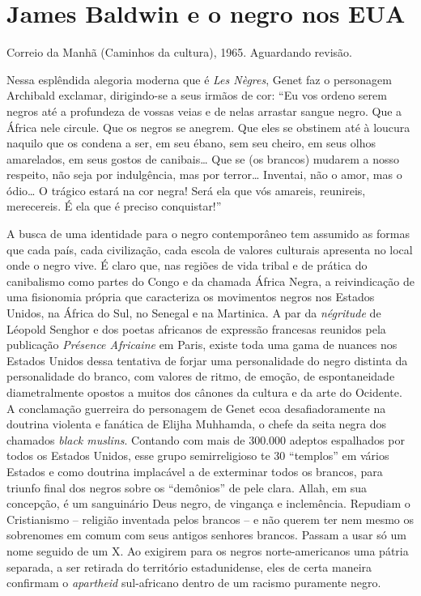 \documentclass[
  letterpaper,
  DIV=11,
  numbers=noendperiod]{scrreprt}
\begin{document}
\chapter{James Baldwin e o negro nos
EUA}\label{james-baldwin-e-o-negro-nos-eua}

Correio da Manhã (Caminhos da cultura), 1965. Aguardando revisão.

\hfill\break

Nessa esplêndida alegoria moderna que é \emph{Les Nègres}, Genet faz o
personagem Archibald exclamar, dirigindo-se a seus irmãos de cor: ``Eu
vos ordeno serem negros até a profundeza de vossas veias e de nelas
arrastar sangue negro. Que a África nele circule. Que os negros se
anegrem. Que eles se obstinem até à loucura naquilo que os condena a
ser, em seu ébano, sem seu cheiro, em seus olhos amarelados, em seus
gostos de canibais\ldots{} Que se (os brancos) mudarem a nosso respeito,
não seja por indulgência, mas por terror\ldots{} Inventai, não o amor,
mas o ódio\ldots{} O trágico estará na cor negra! Será ela que vós
amareis, reunireis, merecereis. É ela que é preciso conquistar!''

A busca de uma identidade para o negro contemporâneo tem assumido as
formas que cada país, cada civilização, cada escola de valores culturais
apresenta no local onde o negro vive. É claro que, nas regiões de vida
tribal e de prática do canibalismo como partes do Congo e da chamada
África Negra, a reivindicação de uma fisionomia própria que caracteriza
os movimentos negros nos Estados Unidos, na África do Sul, no Senegal e
na Martinica. A par da \emph{négritude} de Léopold Senghor e dos poetas
africanos de expressão francesas reunidos pela publicação \emph{Présence
Africaine} em Paris, existe toda uma gama de nuances nos Estados Unidos
dessa tentativa de forjar uma personalidade do negro distinta da
personalidade do branco, com valores de ritmo, de emoção, de
espontaneidade diametralmente opostos a muitos dos cânones da cultura e
da arte do Ocidente. A conclamação guerreira do personagem de Genet ecoa
desafiadoramente na doutrina violenta e fanática de Elijha Muhhamda, o
chefe da seita negra dos chamados \emph{black muslins}. Contando com
mais de 300.000 adeptos espalhados por todos os Estados Unidos, esse
grupo semirreligioso te 30 ``templos'' em vários Estados e como doutrina
implacável a de exterminar todos os brancos, para triunfo final dos
negros sobre os ``demônios'' de pele clara. Allah, em sua concepção, é
um sanguinário Deus negro, de vingança e inclemência. Repudiam o
Cristianismo -- religião inventada pelos brancos -- e não querem ter nem
mesmo os sobrenomes em comum com seus antigos senhores brancos. Passam a
usar só um nome seguido de um X. Ao exigirem para os negros
norte-americanos uma pátria separada, a ser retirada do território
estadunidense, eles de certa maneira confirmam o \emph{apartheid}
sul-africano dentro de um racismo puramente negro.
\end{document}
